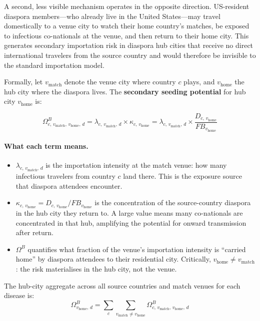 \documentclass[12pt]{article}
\begin{document}
A second, less visible mechanism operates in the opposite direction.
US-resident diaspora members---who already live in the United States---may
travel domestically to a venue city to watch their home country's matches, be
exposed to infectious co-nationals at the venue, and then return to their home
city. This generates secondary importation risk in diaspora hub cities that
receive no direct international travelers from the source country and would
therefore be invisible to the standard importation model.

Formally, let $v_{\text{match}}$ denote the venue city where country $c$
plays, and $v_{\text{home}}$ the hub city where the diaspora lives.
The \textbf{secondary seeding potential} for hub city $v_{\text{home}}$ is:

\begin{equation}
  \Omega^B_{c,\,v_{\text{match}},\,v_{\text{home}},\,d}
    = \lambda_{c,\,v_{\text{match}},\,d} \times \kappa_{c,\,v_{\text{home}}}
    = \lambda_{c,\,v_{\text{match}},\,d}
      \times \frac{D_{c,\,v_{\text{home}}}}{\mathit{FB}_{v_{\text{home}}}}
  \label{eq:omegaB}
\end{equation}

\paragraph{What each term means.}
\begin{itemize}
  \item $\lambda_{c,\,v_{\text{match}},\,d}$ is the importation intensity at
    the match venue: how many infectious travelers from country $c$ land there.
    This is the exposure source that diaspora attendees encounter.
  \item $\kappa_{c,\,v_{\text{home}}} = D_{c,\,v_{\text{home}}}/
    \mathit{FB}_{v_{\text{home}}}$ is the concentration of the source-country
    diaspora in the hub city they return to. A large value means many
    co-nationals are concentrated in that hub, amplifying the potential for
    onward transmission after return.
  \item $\Omega^B$ quantifies what fraction of the venue's importation
    intensity is ``carried home'' by diaspora attendees to their residential
    city. Critically, $v_{\text{home}} \neq v_{\text{match}}$: the risk
    materialises in the hub city, not the venue.
\end{itemize}

The hub-city aggregate across all source countries and match venues for each
disease is:
\begin{equation}
  \Omega^B_{v_{\text{home}},\,d}
    = \sum_c \sum_{v_{\text{match}} \neq v_{\text{home}}}
      \Omega^B_{c,\,v_{\text{match}},\,v_{\text{home}},\,d}
\end{equation}
\end{document}
